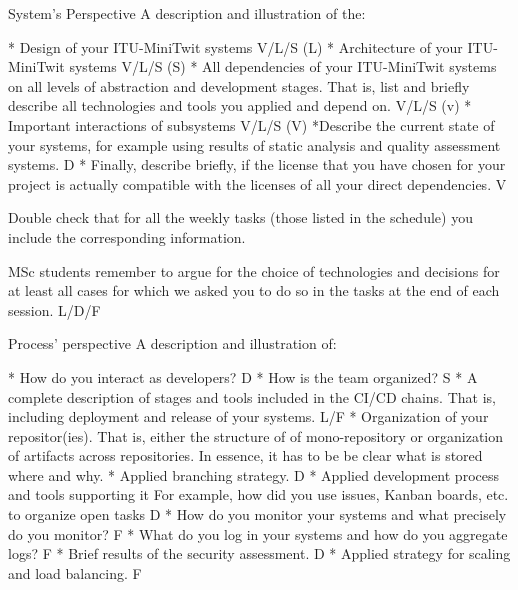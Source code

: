 System's Perspective
A description and illustration of the:

* Design of your ITU-MiniTwit systems V/L/S               (L)
* Architecture of your ITU-MiniTwit systems V/L/S         (S)
* All dependencies of your ITU-MiniTwit systems on all levels of abstraction and development stages.
    That is, list and briefly describe all technologies and tools you applied and depend on. V/L/S  (v)
* Important interactions of subsystems V/L/S       (V)
*Describe the current state of your systems, for example using     results of static analysis and quality assessment systems.   D
* Finally, describe briefly, if the license that you have chosen for your project is actually compatible with the licenses of all your direct dependencies.  V

Double check that for all the weekly tasks (those listed in the schedule) you include the corresponding information.   

MSc students remember to argue for the choice of technologies and decisions for at least all cases for which we asked you to do so in the tasks at the end of each session.  L/D/F



Process' perspective
A description and illustration of:

* How do you interact as developers?     D   
* How is the team organized?          S 
* A complete description of stages and tools included in the CI/CD chains.
    That is, including deployment and release of your systems.    L/F   
* Organization of your repositor(ies).
    That is, either the structure of of mono-repository or organization of artifacts across repositories.
    In essence, it has to be be clear what is stored where and why. 
* Applied branching strategy. D
* Applied development process and tools supporting it
    For example, how did you use issues, Kanban boards, etc. to organize open tasks     D
* How do you monitor your systems and what precisely do you monitor?    F
* What do you log in your systems and how do you aggregate logs?        F
* Brief results of the security assessment.                             D
* Applied strategy for scaling and load balancing.                      F